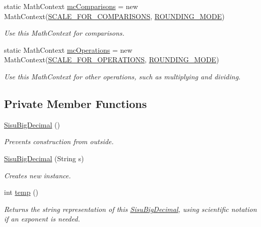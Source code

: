 \begin{DoxyCompactItemize}
static Math\+Context \hyperlink{classcom_1_1aarrelaakso_1_1drawl_1_1_sisu_big_decimal_a9fa3952ce422ce15868eb125788d9054}{mc\+Comparisons} = new Math\+Context(\hyperlink{classcom_1_1aarrelaakso_1_1drawl_1_1_sisu_big_decimal_a5d8592149ed329cfd2f80ec81e790a9e}{S\+C\+A\+L\+E\+\_\+\+F\+O\+R\+\_\+\+C\+O\+M\+P\+A\+R\+I\+S\+O\+NS}, \hyperlink{classcom_1_1aarrelaakso_1_1drawl_1_1_sisu_big_decimal_afcdca984f764db570786fff2442142cb}{R\+O\+U\+N\+D\+I\+N\+G\+\_\+\+M\+O\+DE})
\begin{DoxyCompactList}\small\item\em Use this Math\+Context for comparisons. \end{DoxyCompactList}\item 
static Math\+Context \hyperlink{classcom_1_1aarrelaakso_1_1drawl_1_1_sisu_big_decimal_a7986e3e83f8b0c7b5a3784757ffc5d1d}{mc\+Operations} = new Math\+Context(\hyperlink{classcom_1_1aarrelaakso_1_1drawl_1_1_sisu_big_decimal_a5dfdeb68abdc4865a00b27136c6e8c54}{S\+C\+A\+L\+E\+\_\+\+F\+O\+R\+\_\+\+O\+P\+E\+R\+A\+T\+I\+O\+NS}, \hyperlink{classcom_1_1aarrelaakso_1_1drawl_1_1_sisu_big_decimal_afcdca984f764db570786fff2442142cb}{R\+O\+U\+N\+D\+I\+N\+G\+\_\+\+M\+O\+DE})
\begin{DoxyCompactList}\small\item\em Use this Math\+Context for other operations, such as multiplying and dividing. \end{DoxyCompactList}\end{DoxyCompactItemize}
\subsection*{Private Member Functions}
\begin{DoxyCompactItemize}
\item 
\hyperlink{classcom_1_1aarrelaakso_1_1drawl_1_1_sisu_big_decimal_a67a8c41e95f12142516f7a8f8736386a}{Sisu\+Big\+Decimal} ()
\begin{DoxyCompactList}\small\item\em Prevents construction from outside. \end{DoxyCompactList}\item 
\hyperlink{classcom_1_1aarrelaakso_1_1drawl_1_1_sisu_big_decimal_adb37f7c4abcd831bac26b518c87080af}{Sisu\+Big\+Decimal} (String s)
\begin{DoxyCompactList}\small\item\em Creates new instance. \end{DoxyCompactList}\item 
int \hyperlink{classcom_1_1aarrelaakso_1_1drawl_1_1_sisu_big_decimal_a17c66373817c4e977bbd7a579246be60}{temp} ()
\begin{DoxyCompactList}\small\item\em Returns the string representation of this \hyperlink{classcom_1_1aarrelaakso_1_1drawl_1_1_sisu_big_decimal}{Sisu\+Big\+Decimal}, using scientific notation if an exponent is needed. \end{DoxyCompactList}\end{DoxyCompactItemize}
